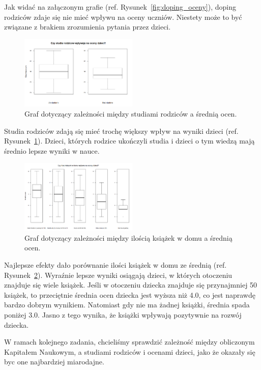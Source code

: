 \documentclass[conference]{IEEEtran}
\begin{document}
Jak widać na załączonym grafie (ref. Rysunek~\ref{fig:doping_oceny}), doping rodziców zdaje się nie mieć wpływu na oceny uczniów. Niestety może to być związane z brakiem zrozumienia pytania przez dzieci.

\begin{figure}
	\centering
	\includegraphics[width=0.5\textwidth]{4.png}
	\caption{Graf dotyczący zależności między studiami rodziców a średnią ocen.}
	\label{fig:studia_oceny}
\end{figure}

Studia rodziców zdają się mieć trochę większy wpływ na wyniki dzieci (ref. Rysunek~\ref{fig:studia_oceny}). Dzieci, których rodzice ukończyli studia i dzieci o tym wiedzą mają średnio lepsze wyniki w nauce.

\begin{figure}
	\centering
	\includegraphics[width=0.5\textwidth]{5.png}
	\caption{Graf dotyczący zależności między ilością książek w domu a średnią ocen.}
	\label{fig:ksiazki_oceny}
\end{figure}

Najlepsze efekty dało porównanie ilości książek w domu ze średnią (ref. Rysunek~\ref{fig:ksiazki_oceny}). Wyraźnie lepsze wyniki osiągają dzieci, w których otoczeniu znajduje się wiele książek. Jeśli w otoczeniu dziecka znajduje się przynajmniej 50 książek, to przeciętnie średnia ocen dziecka jest wyższa niż 4.0, co jest naprawdę bardzo dobrym wynikiem. Natomiast gdy nie ma żadnej książki, średnia spada poniżej 3.0. Jasno z tego wynika, że książki wpływają pozytywnie na rozwój dziecka.

W ramach kolejnego zadania, chcieliśmy sprawdzić zależność między obliczonym Kapitałem Naukowym, a studiami rodziców i ocenami dzieci, jako że okazały się byc one najbardziej miarodajne.
\end{document}
